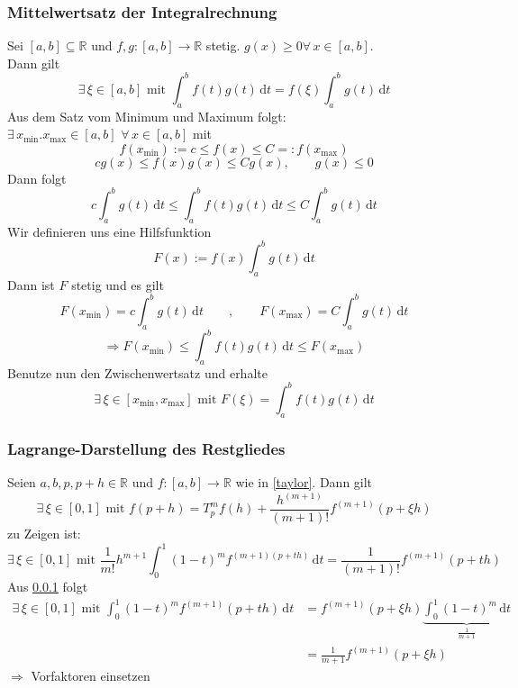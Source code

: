 \subsubsection{Mittelwertsatz der Integralrechnung} %
\label{ssub:mittelwertsatz_der_integralrechnung}
Sei $[a,b] \subseteq \mathbb{R}$ und $f,g:[a,b] \to \mathbb{R}$ stetig. $g(x)\geq 0 \forall\, x \in [a,b]$. \\
Dann gilt
\[
	\exists\, \xi \in [a,b] \text{ mit } \int_{a}^{b}f(t)g(t) \,\mathrm{d}t = f(\xi)\int_{a}^{b}g(t) \,\mathrm{d}t
\]
Aus dem Satz vom Minimum und Maximum folgt: $\exists\, x_{\min}.x_{\max} \in [a,b] \,\, \forall\, x \in [a,b]$ mit
\[
	f(x_{\min}):=c \leq f(x) \leq C =: f(x_{\max}) 
\]
\[
	cg(x) \leq f(x)g(x)\leq C g(x), \qquad g(x) \leq 0
\]
Dann folgt
\[
	c \int_{a}^{b}g(t) \,\mathrm{d}t \leq \int_{a}^{b}f(t)g(t) \,\mathrm{d}t \leq C \int_{a}^{b}g(t) \,\mathrm{d}t
\]
Wir definieren uns eine Hilfsfunktion 
\[
	F(x):=f(x)\int_{a}^{b}g(t) \,\mathrm{d}t
\] Dann ist $F$ stetig und es gilt
\[
	F(x_{\min})=c \int_{a}^{b}g(t) \,\mathrm{d}t \qquad, \qquad F(x_{\max})= C \int_{a}^{b}g(t) \,\mathrm{d}t 
\]
\[
	\Rightarrow F(x_{\min}) \leq \int_{a}^{b}f(t)g(t) \,\mathrm{d}t \leq F(x_{\max})
\]
Benutze nun den Zwischenwertsatz und erhalte
\[
	\exists\, \xi \in [x_{\min},x_{\max}] \text{ mit } F(\xi)= \int_{a}^{b}f(t)g(t) \,\mathrm{d}t
\]
\bewende

\subsubsection{Lagrange-Darstellung des Restgliedes} %
\label{ssub:lagrange_darstellung_des_restgliedes}
Seien $a,b,p,p+h \in \mathbb{R}$ und $f:[a,b]  \to \mathbb{R}$ wie in \ref{taylor}. 
Dann gilt
\[
	\exists\,\xi \in [0,1] \text{ mit } f(p+h)=T^m_pf(h)+ \frac{h^{(m+1)}}{(m+1)!}f^{(m+1)}(p+\xi h)
\]
 zu Zeigen ist:
\[
	\exists\,\xi \in [0,1] \text{ mit } \frac{1}{m!}h^{m+1} \int_{0}^{1}(1-t)^mf^{(m+1)(p+th)} \,\mathrm{d}t = \frac{1}{(m+1)!}f^{(m+1)}(p+th)
\]
Aus \ref{ssub:mittelwertsatz_der_integralrechnung} folgt
\begin{align*}
	\exists\,\xi \in [0,1] \text{ mit } \int_{0}^{1}(1-t)^m f^{(m+1)}(p+th) \,\mathrm{d}t 
	&= f^{(m+1)}(p+\xi h) \underset{\frac{1}{m+1}}{\underbrace{\int_{0}^{1}(1-t)^m \,\mathrm{d}t}} \\
	&= \frac{1}{m+1}f^{(m+1)}(p+\xi h)
\end{align*}
$\Rightarrow$ Vorfaktoren einsetzen
\bewende

